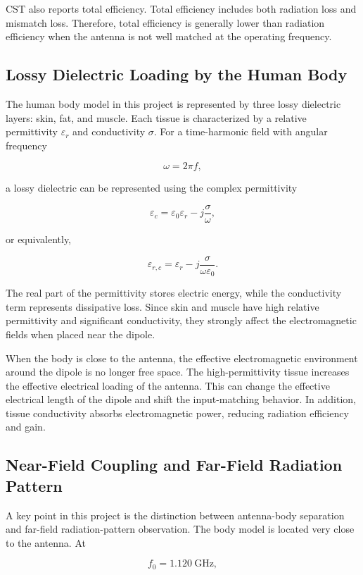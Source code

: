 CST also reports total efficiency. Total efficiency includes both radiation loss and mismatch loss. Therefore, total efficiency is generally lower than radiation efficiency when the antenna is not well matched at the operating frequency.

\subsection{Lossy Dielectric Loading by the Human Body}

The human body model in this project is represented by three lossy dielectric layers: skin, fat, and muscle. Each tissue is characterized by a relative permittivity \(\varepsilon_r\) and conductivity \(\sigma\). For a time-harmonic field with angular frequency

\[
\omega = 2\pi f,
\]

a lossy dielectric can be represented using the complex permittivity

\[
\varepsilon_c =
\varepsilon_0 \varepsilon_r
-
j\frac{\sigma}{\omega},
\]

or equivalently,

\[
\varepsilon_{r,c}
=
\varepsilon_r
-
j\frac{\sigma}{\omega\varepsilon_0}.
\]

The real part of the permittivity stores electric energy, while the conductivity term represents dissipative loss. Since skin and muscle have high relative permittivity and significant conductivity, they strongly affect the electromagnetic fields when placed near the dipole.

When the body is close to the antenna, the effective electromagnetic environment around the dipole is no longer free space. The high-permittivity tissue increases the effective electrical loading of the antenna. This can change the effective electrical length of the dipole and shift the input-matching behavior. In addition, tissue conductivity absorbs electromagnetic power, reducing radiation efficiency and gain.

\subsection{Near-Field Coupling and Far-Field Radiation Pattern}

A key point in this project is the distinction between antenna-body separation and far-field radiation-pattern observation. The body model is located very close to the antenna. At

\[
f_0 = 1.120~\mathrm{GHz},
\]

